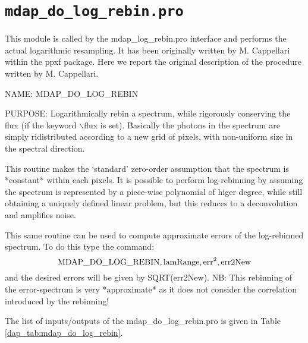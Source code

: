 \section{{\tt mdap\_do\_log\_rebin.pro}}
\label{dap_sec:mdap_do_log_rebin}

This module is called by the mdap\_log\_rebin.pro interface and
performs the actual logarithmic resampling. It has been originally
written by M. Cappellari within the ppxf package. Here we report the
original description of the procedure written by M. Cappellari.

\medskip

 NAME: MDAP\_DO\_LOG\_REBIN

\medskip

 PURPOSE: Logarithmically rebin a spectrum, while rigorously
 conserving the flux (if the keyword $\backslash$flux is set).
 Basically the photons in the spectrum are simply ridistributed
 according to a new grid of pixels, with non-uniform size in the
 spectral direction.

 This routine makes the `standard' zero-order assumption that the
 spectrum is *constant* within each pixels. It is possible to perform
 log-rebinning by assuming the spectrum is represented by a piece-wise
 polynomial of higer degree, while still obtaining a uniquely defined
 linear problem, but this reduces to a deconvolution and amplifies
 noise.

 This same routine can be used to compute approximate errors of the
 log-rebinned spectrum. To do this type the command:
    \[
        {\rm MDAP\_DO\_LOG\_REBIN, lamRange, err}^2{\rm , err2New}
    \]
 and the desired errors will be given by SQRT(err2New).  NB: This
 rebinning of the error-spectrum is very *approximate* as it does not
 consider the correlation introduced by the rebinning!

The list of inputs/outputs of the mdap\_do\_log\_rebin.pro is given in
Table \ref{dap_tab:mdap_do_log_rebin}.

